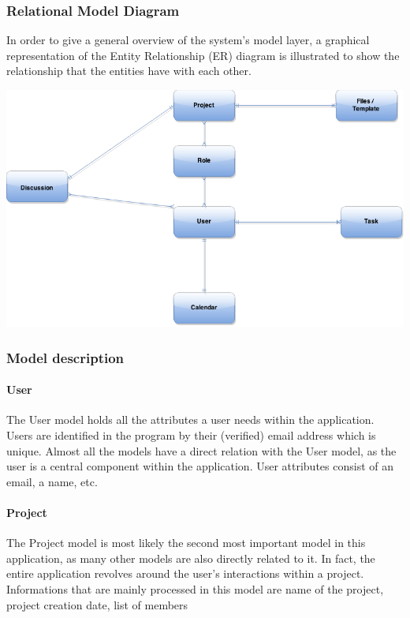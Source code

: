 \subsubsection{Relational Model Diagram}

In order to give a general overview of the system's model layer, a graphical representation of the Entity Relationship (ER) diagram is illustrated to
show the relationship that the entities have with each other.

\begin{center}
\includegraphics[scale=0.3]{./img/dsgn_img/RMA.png}
	
\end{center}

\subsubsection{Model description}
\paragraph{User}
The User model holds all the attributes a user needs within the application. Users are identified in the program by their (verified) email address 
which is unique. Almost all the models have a direct relation with the User model, as the user is a central component within the application. User 
attributes consist of an email, a name, etc.

\paragraph{Project}

The Project model is most likely the second most important model in this application, as many other models are also directly related to it. In fact, 
the entire application revolves around the user's interactions within a project. Informations that are mainly processed in this model are name of the project, project creation date, list of members

